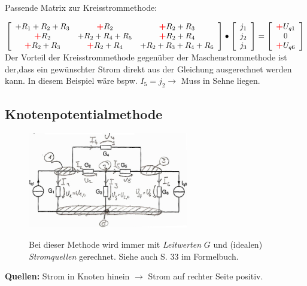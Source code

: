 Passende Matrix zur Kreisstrommethode:

$\left[\begin{array}{ccc}
	+R_1+R_2+R_3 &\text{\textbf{\textcolor{red}{+}}}R_2 &\text{\textbf{\textcolor{red}{+}}}R_2+R_3\\
	\text{\textbf{\textcolor{red}{+}}}R_2 &+R_2+R_4+R_5
	&\text{\textbf{\textcolor{red}{+}}}R_2+R_4\\ 
	\text{\textbf{\textcolor{red}{+}}}R_2+R_3 &\text{\textbf{\textcolor{red}{+}}}R_2+R_4 &+R_2+R_3+R_4+R_6
	\end{array}\right] \bullet 
	\left[\begin{array}{l}j_1\\j_2\\j_3\end{array}\right] = 
	\left[\begin{array}{c}\text{\textbf{\textcolor{red}{+}}}U_{q1}\\0\\
	\text{\textbf{\textcolor{red}{+}}}U_{q6}
\end{array}\right]$\\

Der Vorteil der Kreisstrommethode gegenüber der Maschenstrommethode ist der,dass ein gewünschter Strom direkt aus der Gleichung ausgerechnet werden kann. In diesem Beispiel wäre bspw. $I_5 = j_2\rightarrow$ Muss in Sehne liegen.

\subsection{Knotenpotentialmethode}
\begin{figure}[hct]
  \begin{minipage}[lt]{7 cm}
    \includegraphics[width=7cm]{pics/dcnet/knotenpotentialmethode} 
  \end{minipage}
  \begin{minipage}[rt]{9.35 cm} %
  Bei dieser Methode wird immer mit \textit{Leitwerten} $G$  und (idealen) \textit{Stromquellen}
gerechnet. Siehe auch S. 33 im Formelbuch.
  \end{minipage}
\end{figure}

\textbf{Quellen:} Strom in Knoten hinein $\rightarrow$ Strom auf rechter Seite positiv.\\

